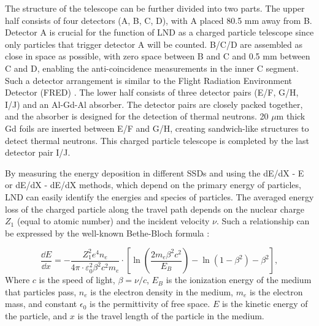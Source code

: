 The structure of the telescope can be further divided into two parts. The upper half consists of four detectors (A, B, C, D), with A placed 80.5 mm away from B. Detector A is crucial for the function of \ac{LND} as a charged particle telescope since only particles that trigger detector A will be counted. B/C/D are assembled as close in space as possible, with zero space between B and C and 0.5 mm between C and D, enabling the anti-coincidence measurements in the inner C segment. Such a detector arrangement is similar to the Flight Radiation Environment Detector (FRED) \citep{moeller-etal-2013, moeller-etal-2013b}. The lower half consists of three detector pairs (E/F, G/H, I/J) and an Al-Gd-Al absorber. The detector pairs are closely packed together, and the absorber is designed for the detection of thermal neutrons. 20 $\mu$m thick Gd foils are inserted between E/F and G/H, creating sandwich-like structures to detect thermal neutrons. This charged particle telescope is completed by the last detector pair I/J.

By measuring the energy deposition in different \acp{SSD} and using the dE/dX - E or dE/dX - dE/dX methods, which depend on the primary energy of particles, LND can easily identify the energies and species of particles. 
The averaged energy loss of the charged particle along the travel path depends on the nuclear charge $Z_1$ (equal to atomic number) and the incident velocity $\nu$. 
Such a relationship can be expressed by the well-known Bethe-Bloch formula \citep{bethe-1930, bloch-1933}:

\begin{equation}
    \frac{\dd E}{\dd x} = - \frac{Z_1^2 e^4 n_e}{4 \pi \cdot \varepsilon_0^2 \beta^2 c^2 m_e} \cdot \left[ \ln\left(\frac{2 m_e  \beta^2 c^2}{{E_B}}\right) - \ln(1 - \beta^2) - \beta^2  \right], 
    \label{eq:BB}
  \end{equation}
Where $c$ is the speed of light, $\beta = \nu/c$, $E_B$ is the ionization energy of the medium that particles pass, $n_e$ is the electron density in the medium, $m_e$ is the electron mass, and constant $\epsilon_0$ is the permittivity of free space. $E$ is the kinetic energy of the particle, and $x$ is the travel length of the particle in the medium.

